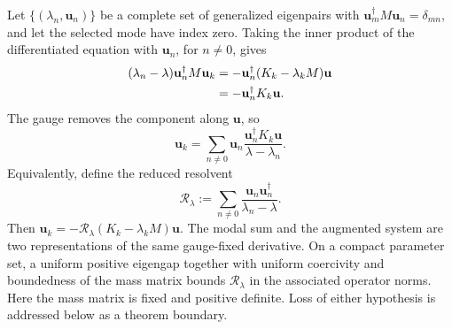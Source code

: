 Let \(\{(\lambda_n,\mathbf u_n)\}\) be a complete set of generalized
eigenpairs with
\(\mathbf u_m^\dagger M\mathbf u_n=\delta_{mn}\), and let the selected
mode have index zero.  Taking the inner product of the differentiated
equation with \(\mathbf u_n\), for \(n\ne0\), gives
\begin{align}
  (\lambda_n-\lambda)
  \mathbf u_n^\dagger M\mathbf u_k
  &=-\mathbf u_n^\dagger
       (K_k-\lambda_kM)\mathbf u                                      \notag\\
  &=-\mathbf u_n^\dagger K_k\mathbf u.
  \label{eq:mode-derivative-coefficient}
\end{align}
The gauge removes the component along \(\mathbf u\), so
\begin{equation}
  \mathbf u_k
  =\sum_{n\ne0}
    \mathbf u_n
    \frac{\mathbf u_n^\dagger K_k\mathbf u}{\lambda-\lambda_n}.
  \label{eq:mode-derivative-modal-sum}
\end{equation}
Equivalently, define the reduced resolvent
\begin{equation}
  \mathcal R_\lambda
  :=\sum_{n\ne0}
    \frac{\mathbf u_n\mathbf u_n^\dagger}{\lambda_n-\lambda}.
  \label{eq:reduced-resolvent}
\end{equation}
Then
\(
  \mathbf u_k=-\mathcal R_\lambda
  (K_k-\lambda_kM)\mathbf u
\).
The modal sum and the augmented system are two representations of the same
gauge-fixed derivative.  On a compact parameter set, a uniform positive
eigengap together with uniform coercivity and boundedness of the mass matrix
bounds \(\mathcal R_\lambda\) in the associated operator norms.  Here the
mass matrix is fixed and positive definite.  Loss of either hypothesis is
addressed below as a theorem boundary.

